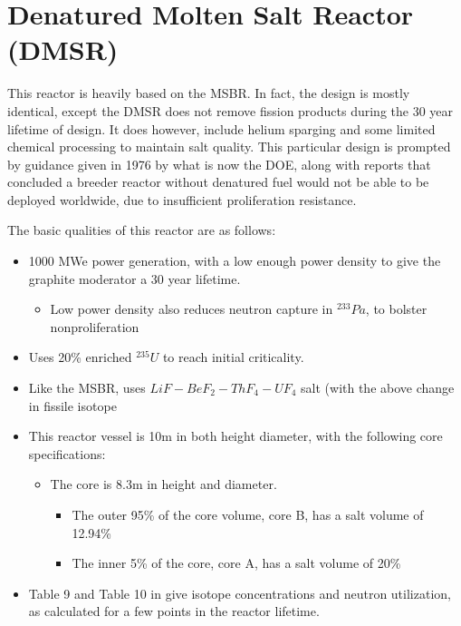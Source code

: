 \documentclass[letterpaper]{article}
\begin{document}
\section{Denatured Molten Salt Reactor (DMSR)}

This reactor is heavily based on the MSBR.  In fact, the design is mostly identical, except the DMSR does not remove fission products during the 30 year lifetime of design.  It does however, include helium sparging and some limited chemical processing to maintain salt quality.  This particular design is prompted by guidance given in 1976 by what is now the DOE, along with reports that concluded a breeder reactor without denatured fuel would not be able to be deployed worldwide, due to insufficient proliferation resistance. \cite{engel_conceptual_1980}

The basic qualities of this reactor are as follows:

\begin{itemize}
\item 1000 MWe power generation, with a low enough power density to give the graphite moderator a 30 year lifetime.
	\begin{itemize}
	\item Low power density also reduces neutron capture in ${}^{233}Pa$, to bolster nonproliferation
	\end{itemize}
\item Uses 20\% enriched ${}^{235}U$ to reach initial criticality.
\item Like the MSBR, uses $LiF - BeF_2 - ThF_4 - UF_4$ salt (with the above change in fissile isotope
\item This reactor vessel is 10m in both height diameter, with the following core specifications:
	\begin{itemize}
	\item The core is 8.3m in height and diameter.
		\begin{itemize}
		\item The outer 95\% of the core volume, core B, has a salt volume of 12.94\%
		\item The inner 5\% of the core, core A, has a salt volume of 20\%
		\end{itemize}
	\end{itemize}
\item Table 9 and Table 10 in \cite{engel_conceptual_1980} give isotope concentrations and neutron utilization, as calculated for a few points in the reactor lifetime.
\end{itemize}
\end{document}
